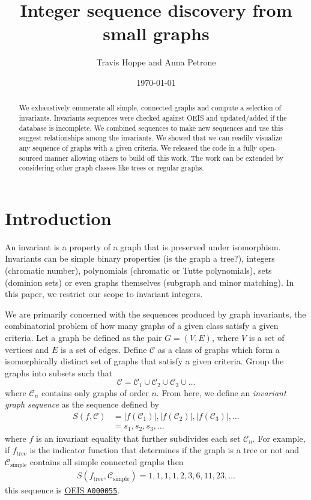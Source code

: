 \documentclass[12pt]{article}
\newcommand{\OEIS}[1]
{\href{https://oeis.org/#1}{OEIS \texttt{#1}}}
\begin{document}
\title{Integer sequence discovery from small graphs}
\author{Travis Hoppe and Anna Petrone}
\date{\today}
\maketitle

\begin{abstract}
We exhaustively enumerate all simple, connected graphs and compute a selection of invariants. 
Invariants sequences were checked against OEIS and updated/added if the database is incomplete.
We combined sequences to make new sequences and use this suggest relationships among the invariants.
We showed that we can readily visualize any sequence of graphs with a given criteria.
We released the code in a fully open-sourced manner allowing others to build off this work.
The work can be extended by considering other graph classes like trees or regular graphs.
\end{abstract}

\section{Introduction}

An invariant is a property of a graph that is preserved under isomorphism. 
Invariants can be simple binary properties (is the graph a tree?), integers (chromatic number), polynomials (chromatic or Tutte polynomials), sets (dominion sets) or even graphs themselves (subgraph and minor matching).
In this paper, we restrict our scope to invariant integers.

We are primarily concerned with the sequences produced by graph invariants, the combinatorial problem of how many graphs of a given class satisfy a given criteria.
Let a graph be defined as the pair $G = (V,E)$, where $V$ is a set of vertices and $E$ is a set of edges. 
Define $\mathcal{C}$ as a class of graphs which form a isomorphically distinct set of graphs that satisfy a given criteria.
Group the graphs into subsets such that
\begin{equation}
\mathcal{C} = \mathcal{C}_1 \cup \mathcal{C}_2 \cup \mathcal{C}_3 \cup \ldots
\end{equation}
where $\mathcal{C}_n$ contains only graphs of order $n$.
From here, we define an \textit{invariant graph sequence} as the sequence defined by 
\begin{align}
S(f, \mathcal{C}) 
&= |f(\mathcal{C}_1)|, |f(\mathcal{C}_2)|, |f(\mathcal{C}_3)|, \ldots  \\
&= s_1, s_2, s_3, \ldots
\end{align}
%
where $f$ is an invariant equality that further subdivides each set $\mathcal{C}_n$. 
For example, if $f_\text{tree}$ is the indicator function that determines if the graph is a tree or not and $\mathcal{C}_\text{simple}$ contains all simple connected graphs then
\begin{align}
S(f_\text{tree}, \mathcal{C}_\text{simple}) = 1, 1, 1, 1, 2, 3, 6, 11, 23, \ldots
\end{align}
this sequence is \OEIS{A000055}.
\end{document}
